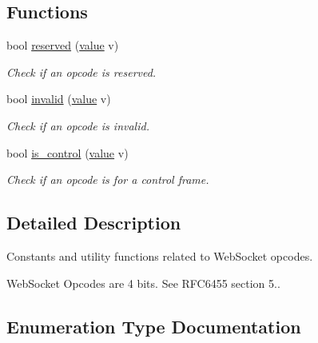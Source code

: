 \subsection*{Functions}
\begin{DoxyCompactItemize}
\item 
bool \hyperlink{namespacewebsocketpp_1_1frame_1_1opcode_a9890345367f4c8bdf565d62e00afbc61}{reserved} (\hyperlink{namespacewebsocketpp_1_1frame_1_1opcode_ae68711643096dfc4af6d66ade3f9fd5e}{value} v)
\begin{DoxyCompactList}\small\item\em Check if an opcode is reserved. \end{DoxyCompactList}\item 
bool \hyperlink{namespacewebsocketpp_1_1frame_1_1opcode_a6f451ade60e2cca4caac58347643443a}{invalid} (\hyperlink{namespacewebsocketpp_1_1frame_1_1opcode_ae68711643096dfc4af6d66ade3f9fd5e}{value} v)
\begin{DoxyCompactList}\small\item\em Check if an opcode is invalid. \end{DoxyCompactList}\item 
bool \hyperlink{namespacewebsocketpp_1_1frame_1_1opcode_aa5e7f94a35f8fb59a925fa01636f08ad}{is\+\_\+control} (\hyperlink{namespacewebsocketpp_1_1frame_1_1opcode_ae68711643096dfc4af6d66ade3f9fd5e}{value} v)
\begin{DoxyCompactList}\small\item\em Check if an opcode is for a control frame. \end{DoxyCompactList}\end{DoxyCompactItemize}


\subsection{Detailed Description}
Constants and utility functions related to Web\+Socket opcodes. 

Web\+Socket Opcodes are 4 bits. See R\+F\+C6455 section 5.. 

\subsection{Enumeration Type Documentation}
\hypertarget{namespacewebsocketpp_1_1frame_1_1opcode_ae68711643096dfc4af6d66ade3f9fd5e}{}
